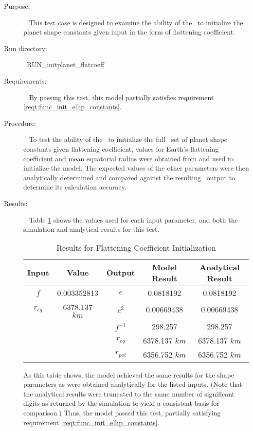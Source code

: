 \label{test:init_flatcoeff}
\begin{description}
\item[Purpose:]\ \newline
This test case is designed to examine the ability of the \planetDesc\ to
initialize the planet shape constants given input in the form of flattening
coefficient.
\item[Run directory:]\ \newline RUN\_initplanet\_flatcoeff
\item[Requirements:]\ \newline
By passing this test, this model partially satisfies requirement
\mbox{\ref{reqt:func_init_ellip_constants}}.

\item[Procedure:]\ \newline
To test the ability of the \planetDesc\ to initialize the full \JEODid\ set of
planet shape constants given flattening coefficient, values for Earth's
flattening coefficient and mean equatorial radius were obtained from
\cite{ValladoSecond} and used to initialize the model.  The expected values of
the other parameters were then analytically determined and compared against the
resulting \planetDesc\ output to determine its calculation accuracy.

\item[Results:]\ \newline
Table \ref{flatcoeff_init_table} shows the values used for each input parameter,
and both the simulation and analytical results for this test.

\begin{table}[ht]
\begin{center}
\begin{tabular}{|c|c|c|c|c|}\hline
 Input & Value & Output & Model Result & Analytical Result \\ \hline
 $f$ & 0.003352813 & $e$ & 0.0818192 & 0.0818192 \\ \hline
 $r_{eq}$ & 6378.137 $km$ & $e^2$ & 0.00669438 & 0.00669438 \\ \hline
   &   & $f^{-1}$ & 298.257 & 298.257 \\ \hline
   &   & $r_{eq}$ & 6378.137 $km$ & 6378.137 $km$ \\ \hline
   &   & $r_{pol}$ & 6356.752 $km$ & 6356.752 $km$ \\ \hline
\end{tabular}
\caption{Results for Flattening Coefficient Initialization}
\label{flatcoeff_init_table}
\end{center}
\end{table}

As this table shows, the model achieved the same results for the shape
parameters as were obtained analytically for the listed inputs. (Note that the
analytical results were truncated to the same number of significant digits as
returned by the simulation to yield a consistent basis for comparison.) Thus,
the model passed this test, partially satisfying requirement
\mbox{\ref{reqt:func_init_ellip_constants}}.
\end{description}


